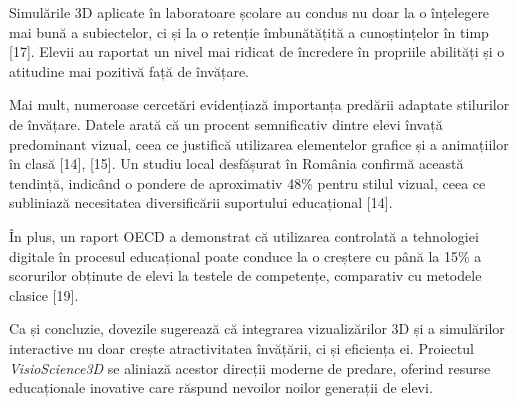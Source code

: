 Simulările 3D aplicate în laboratoare școlare au condus nu doar la o înțelegere mai bună a subiectelor,
ci și la o retenție îmbunătățită a cunoștințelor în timp [17]. Elevii au raportat un nivel mai ridicat
de încredere în propriile abilități și o atitudine mai pozitivă față de învățare.

Mai mult, numeroase cercetări evidențiază importanța predării adaptate stilurilor de învățare.
Datele arată că un procent semnificativ dintre elevi învață predominant vizual, ceea ce
justifică utilizarea elementelor grafice și a animațiilor în clasă [14], [15]. 
Un studiu local desfășurat în România confirmă această tendință, indicând o pondere
de aproximativ 48\% pentru stilul vizual, ceea ce subliniază necesitatea diversificării 
suportului educațional [14].

În plus, un raport OECD a demonstrat că utilizarea controlată a tehnologiei digitale
în procesul educațional poate conduce la o creștere cu până la 15\% a scorurilor
obținute de elevi la testele de competențe, comparativ cu metodele clasice [19].

Ca și concluzie, dovezile sugerează că integrarea vizualizărilor 3D și a simulărilor
interactive nu doar crește atractivitatea învățării, ci și eficiența ei.
Proiectul \textit{VisioScience3D} se aliniază acestor direcții moderne de predare,
oferind resurse educaționale inovative care răspund nevoilor noilor generații de elevi.






